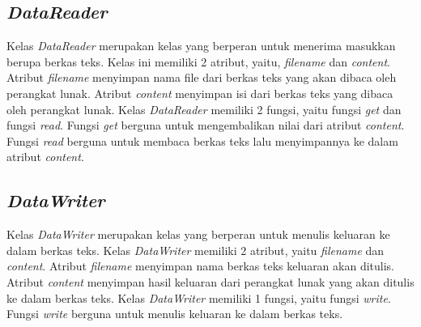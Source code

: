 \subsection{\textit{DataReader}}

Kelas \textit{DataReader} merupakan kelas yang berperan untuk menerima masukkan berupa berkas teks. Kelas ini memiliki 2 atribut, yaitu, \textit{filename} dan \textit{content}. Atribut \textit{filename} menyimpan nama file dari berkas teks yang akan dibaca oleh perangkat lunak. Atribut \textit{content} menyimpan isi dari berkas teks yang dibaca oleh perangkat lunak. Kelas \textit{DataReader} memiliki 2 fungsi, yaitu fungsi \textit{get} dan fungsi \textit{read}. Fungsi \textit{get} berguna untuk mengembalikan nilai dari atribut \textit{content}. Fungsi \textit{read} berguna untuk membaca berkas teks lalu menyimpannya ke dalam atribut \textit{content}.

\subsection{\textit{DataWriter}}

Kelas \textit{DataWriter} merupakan kelas yang berperan untuk menulis keluaran ke dalam berkas teks. Kelas \textit{DataWriter} memiliki 2 atribut, yaitu \textit{filename} dan \textit{content}. Atribut \textit{filename} menyimpan nama berkas teks keluaran akan ditulis. Atribut \textit{content} menyimpan hasil keluaran dari perangkat lunak yang akan ditulis ke dalam berkas teks. Kelas \textit{DataWriter} memiliki 1 fungsi, yaitu fungsi \textit{write}. Fungsi \textit{write} berguna untuk menulis keluaran ke dalam berkas teks.